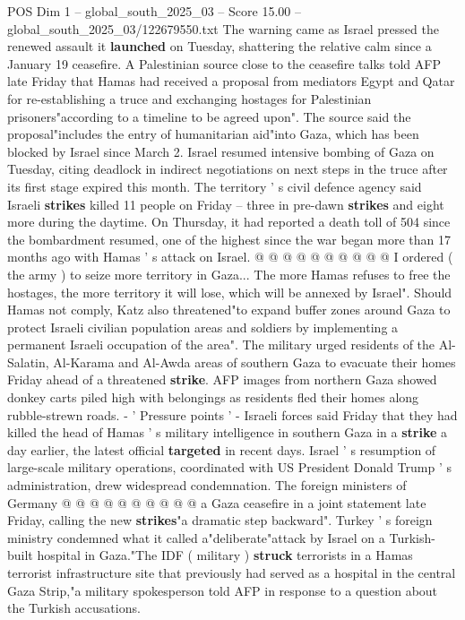 \begin{textsample}{POS Dim 1 – global\_south\_2025\_03 – Score 15.00 – global\_south\_2025\_03/122679550.txt}  \label{ex:f1_pos_297}
The warning came as Israel pressed the renewed assault it \textbf{launched} on Tuesday, shattering the relative calm since a January 19 ceasefire.
A Palestinian source close to the ceasefire talks told AFP late Friday that Hamas had received a proposal from mediators Egypt and Qatar for re-establishing a truce and exchanging hostages for Palestinian prisoners"according to a timeline to be agreed upon".
The source said the proposal"includes the entry of humanitarian aid"into Gaza, which has been blocked by Israel since March 2.
Israel resumed intensive bombing of Gaza on Tuesday, citing deadlock in indirect negotiations on next steps in the truce after its first stage expired this month.
The territory ' s civil defence agency said Israeli \textbf{strikes} killed 11 people on Friday -- three in pre-dawn \textbf{strikes} and eight more during the daytime.
On Thursday, it had reported a death toll of 504 since the bombardment resumed, one of the highest since the war began more than 17 months ago with Hamas ' s attack on Israel. @ @ @ @ @ @ @ @ @ @ I ordered ( the army ) to seize more territory in Gaza...
The more Hamas refuses to free the hostages, the more territory it will lose, which will be annexed by Israel".
Should Hamas not comply, Katz also threatened"to expand buffer zones around Gaza to protect Israeli civilian population areas and soldiers by implementing a permanent Israeli occupation of the area".
The military urged residents of the Al-Salatin, Al-Karama and Al-Awda areas of southern Gaza to evacuate their homes Friday ahead of a threatened \textbf{strike}.
AFP images from northern Gaza showed donkey carts piled high with belongings as residents fled their homes along rubble-strewn roads. - ' Pressure points ' - Israeli forces said Friday that they had killed the head of Hamas ' s military intelligence in southern Gaza in a \textbf{strike} a day earlier, the latest official \textbf{targeted} in recent days.
Israel ' s resumption of large-scale military operations, coordinated with US President Donald Trump ' s administration, drew widespread condemnation.
The foreign ministers of Germany @ @ @ @ @ @ @ @ @ @ a Gaza ceasefire in a joint statement late Friday, calling the new \textbf{strikes}"a dramatic step backward".
Turkey ' s foreign ministry condemned what it called a"deliberate"attack by Israel on a Turkish-built hospital in Gaza."The IDF ( military ) \textbf{struck} terrorists in a Hamas terrorist infrastructure site that previously had served as a hospital in the central Gaza Strip,"a military spokesperson told AFP in response to a question about the Turkish accusations.

\end{textsample}
